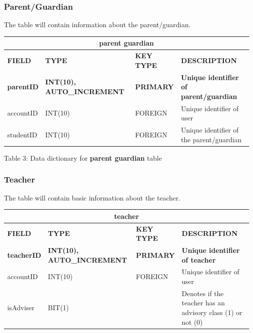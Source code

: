 \documentclass[11pt,a4paper,titlepage]{article}
\begin{document}
\subsubsection{Parent/Guardian}

The table will contain information about the parent/guardian.

\vspace{1cm}
\begin{longtable}{ |p{2.5cm}|p{4.5cm}|p{2.5cm}|p{3cm}|  }
    \hline
    \multicolumn{4}{|c|}{\textbf{parent guardian}} \\
    \hline
    \textbf{FIELD}&\textbf{TYPE}&\textbf{KEY TYPE}&\textbf{DESCRIPTION}\\
    \hline
    \textbf{parentID}   & \textbf{INT(10), AUTO\_INCREMENT}  & \textbf{PRIMARY} & \textbf{Unique identifier of parent/guardian}\\ \hline
    accountID& INT(10) & FOREIGN & Unique identifier of user \\ \hline
    studentID& INT(10) & FOREIGN & Unique identifier of the parent/guardian\\ \hline
\end{longtable}

\vspace{.5cm}
\begin{center}
    Table 3: Data dictionary for \textbf{parent guardian} table
\end{center}


\subsubsection{Teacher}

The table will contain basic information about the teacher.

\vspace{1cm}
\begin{longtable}{ |p{2.5cm}|p{4.5cm}|p{2.5cm}|p{3cm}|  }
    \hline
    \multicolumn{4}{|c|}{\textbf{teacher}} \\
    \hline
    \textbf{FIELD}&\textbf{TYPE}&\textbf{KEY TYPE}&\textbf{DESCRIPTION}\\
    \hline
    \textbf{teacherID}   & \textbf{INT(10), AUTO\_INCREMENT}  & \textbf{PRIMARY} & \textbf{Unique identifier of teacher}\\ \hline
    accountID& INT(10) & FOREIGN & Unique identifier of user \\ \hline
    isAdviser& BIT(1) & & Denotes if the teacher has an advisory class (1) or not (0) \\ \hline
\end{longtable}
\end{document}
